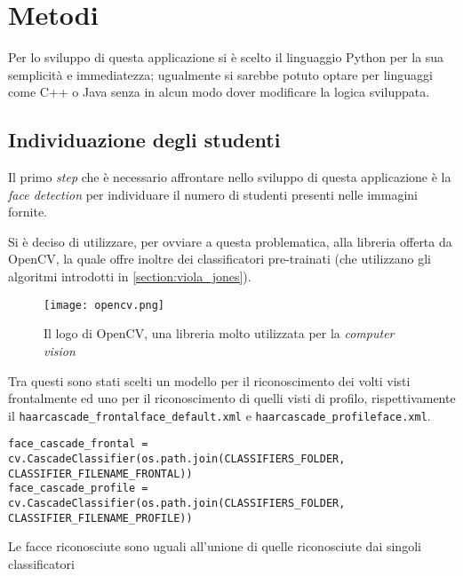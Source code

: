 \chapter{Metodi}
\label{section:methods}

Per lo sviluppo di questa applicazione si è scelto il linguaggio Python per la sua semplicità 
e immediatezza; ugualmente si sarebbe potuto optare per linguaggi come C++ o Java senza in alcun 
modo dover modificare la logica sviluppata.

\section{Individuazione degli studenti}
\label{section:methods_face_detection}

Il primo \textit{step} che è necessario affrontare nello sviluppo di questa applicazione
è la \textit{face detection} per individuare il numero di studenti presenti nelle immagini 
fornite. 

Si è deciso di utilizzare, per ovviare a questa problematica, alla libreria offerta da OpenCV, 
la quale offre inoltre dei classificatori pre-trainati (che utilizzano gli algoritmi introdotti 
in \ref{section:viola_jones}).

\begin{figure}
    \begin{small}
        \begin{center}
            \texttt{[image: opencv.png]}
        \end{center}
        \caption{Il logo di OpenCV, una libreria molto utilizzata per la \textit{computer vision} 
            \cite{opencv}}
        \label{fig:opencv}
    \end{small}
\end{figure}

Tra questi sono stati scelti un modello per il riconoscimento dei volti visti frontalmente ed 
uno per il riconoscimento di quelli visti di profilo, rispettivamente il \lstinline{haarcascade_frontalface_default.xml} 
e \lstinline{haarcascade_profileface.xml}.

\begin{verbatim}
face_cascade_frontal = cv.CascadeClassifier(os.path.join(CLASSIFIERS_FOLDER, CLASSIFIER_FILENAME_FRONTAL))
face_cascade_profile = cv.CascadeClassifier(os.path.join(CLASSIFIERS_FOLDER, CLASSIFIER_FILENAME_PROFILE))
\end{verbatim}

Le facce riconosciute sono uguali all'unione di quelle riconosciute dai singoli classificatori

